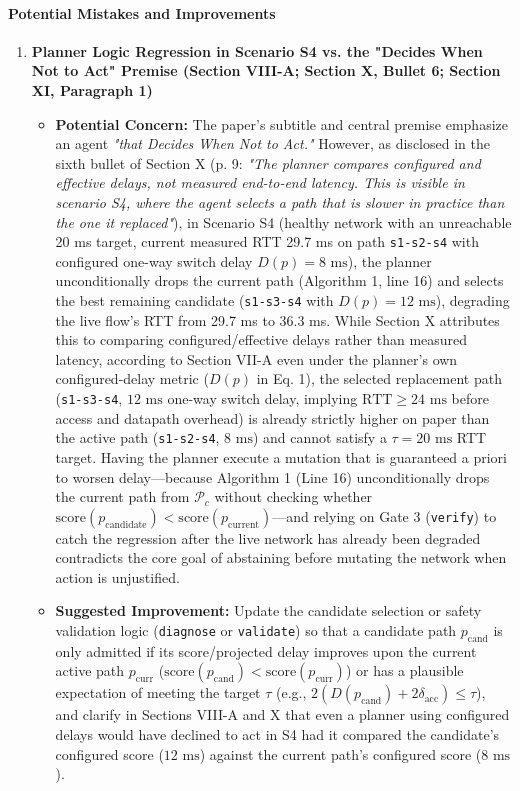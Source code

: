 \documentclass[11pt,a4paper]{article}
\begin{document}
\paragraph{Potential Mistakes and Improvements}
\begin{enumerate}[leftmargin=1.6em,itemsep=3pt]
\item \textbf{Planner Logic Regression in Scenario S4 vs. the "Decides When Not to Act" Premise (Section VIII-A; Section X, Bullet 6; Section XI, Paragraph 1)}
\begin{itemize}[leftmargin=1.8em,itemsep=2pt]
\item \textbf{Potential Concern:} The paper's subtitle and central premise emphasize an agent \emph{"that Decides When Not to Act."} However, as disclosed in the sixth bullet of Section X (p. 9: \emph{"The planner compares configured and effective delays, not measured end-to-end latency. This is visible in scenario S4, where the agent selects a path that is slower in practice than the one it replaced"}), in Scenario S4 (healthy network with an unreachable 20 ms target, current measured RTT 29.7 ms on path \texttt{s1-s2-s4} with configured one-way switch delay $D(p) = 8\text{ ms}$), the planner unconditionally drops the current path (Algorithm 1, line 16) and selects the best remaining candidate (\texttt{s1-s3-s4} with $D(p) = 12\text{ ms}$), degrading the live flow's RTT from 29.7 ms to 36.3 ms. While Section X attributes this to comparing configured/effective delays rather than measured latency, according to Section VII-A even under the planner's own configured-delay metric ($D(p)$ in Eq. 1), the selected replacement path (\texttt{s1-s3-s4}, $12\text{ ms}$ one-way switch delay, implying $\text{RTT} \ge 24\text{ ms}$ before access and datapath overhead) is already strictly higher on paper than the active path (\texttt{s1-s2-s4}, $8\text{ ms}$) and cannot satisfy a $\tau = 20\text{ ms}$ RTT target. Having the planner execute a mutation that is guaranteed a priori to worsen delay—because Algorithm 1 (Line 16) unconditionally drops the current path from $\mathcal{P}_c$ without checking whether $\text{score}(p_{\text{candidate}}) < \text{score}(p_{\text{current}})$—and relying on Gate 3 (\texttt{verify}) to catch the regression after the live network has already been degraded contradicts the core goal of abstaining before mutating the network when action is unjustified.
\item \textbf{Suggested Improvement:} Update the candidate selection or safety validation logic (\texttt{diagnose} or \texttt{validate}) so that a candidate path $p_{\text{cand}}$ is only admitted if its score/projected delay improves upon the current active path $p_{\text{curr}}$ ($\text{score}(p_{\text{cand}}) < \text{score}(p_{\text{curr}})$) or has a plausible expectation of meeting the target $\tau$ (e.g., $2(D(p_{\text{cand}}) + 2\delta_{\text{acc}}) \le \tau$), and clarify in Sections VIII-A and X that even a planner using configured delays would have declined to act in S4 had it compared the candidate's configured score ($12\text{ ms}$) against the current path's configured score ($8\text{ ms}$).
\end{itemize}
\end{enumerate}
\end{document}
